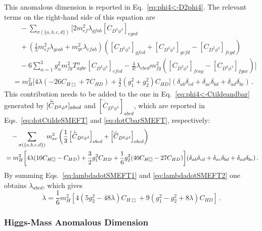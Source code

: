 This anomalous dimension is reported in Eq.~\eqref{eq:phi4<-D2phi4}. 
The relevant terms on the right-hand side of this equation are
\begin{align}
    &\quad - \sum_{\sigma(\{a,b,c,d\})} \Bigg[2m^2_{ef}\lambda_{gfab}\left[C_{D^2\phi^4}\right]_{egcd}\nonumber\\\nonumber 
    &\quad +\left(\frac{1}{3}m^2_{ef}\lambda_{gcab}+m^2_{gc}\lambda_{efab}\right)\left(\left[C_{D^2\phi^4}\right]_{gfed}+\left[C_{D^2\phi^4}\right]_{gefd}-\left[C_{D^2\phi^4}\right]_{fegd}\right)\\
    &\quad -6\sum_{\alpha=1}^{3} g_\alpha^2 m^2_{fg} T^\alpha_{agbe} \left[C_{D^2\phi^4}\right]_{efcd}
    -\frac{4}{3!}\lambda_{ebcd}m^2_{fg}\left(
    \left[C_{D^2\phi^4}\right]_{feag}-\left[C_{D^2\phi^4}\right]_{fgae}
    \right)
    \Bigg]\nonumber \\
    &= m_H^2\bigg[  4  \lambda \left(-26 C_{H\Box}+7C_{HD}\right)
    +\frac{3}{2}(g_1^2+g_2^2) C_{HD}
    \bigg](\delta_{ab}\delta_{cd}+\delta_{ac}\delta_{bd}+\delta_{ad}\delta_{bc})\,.\label{eq:lambdadotSMEFT1}
\end{align}
This contribution needs to be added to the one in Eq.~\eqref{eq:phi4<-Ctildeandbar} generated by $[\dot{\widetilde{C}}_{D^2\phi^4}]_{abcd}$ and $[\dot{\overline C}_{D^2\phi^4}]_{abcd}$, which are reported in Eqs.~\eqref{eq:dotCtildeSMEFT} and \eqref{eq:dotCbarSMEFT}, respectively:
\begin{align}
    &\quad - \sum_{\sigma(\{a,b,c,d\})}m^2_{ae}\left(
    \frac{1}{3}\left[\dot{\widetilde{C}}_{D^2\phi^4}\right]_{ebcd}+\left[\dot{\overline C}_{D^2\phi^4}\right]_{ebcd}
    \right)\label{eq:lambdadotSMEFT2} \\
    &= m_H^2\bigg[  4\lambda (10 C_{H\Box}-C_{HD})+\frac{3}{2}g_1^2C_{HD}+\frac{1}{6}g_2^2(40 C_{H\Box }-27 C_{HD})
    \bigg](\delta_{ab}\delta_{cd}+\delta_{ac}\delta_{bd}+\delta_{ad}\delta_{bc})\,.\nonumber
\end{align}
By summing Eqs.~\eqref{eq:lambdadotSMEFT1} and \eqref{eq:lambdadotSMEFT2} one obtains $\dot \lambda_{abcd}$, which gives
\begin{equation}
    \dot\lambda =\frac{1}{6}m_H^2\left[4\left(5g_2^2-48\lambda\right)C_{H\Box}+9\left(
    g_1^2-g_2^2+8\lambda
    \right)C_{HD}\right] \,.
\end{equation}

\subsubsection{Higgs-Mass Anomalous Dimension}

